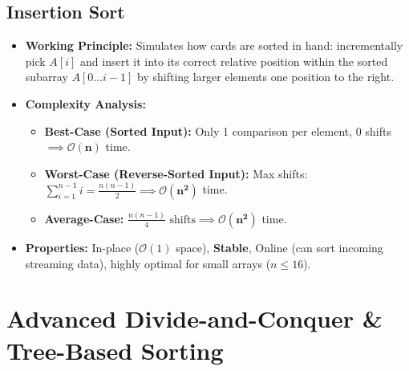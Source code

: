 \documentclass[12pt,a4paper]{article}
\begin{document}
\subsection{Insertion Sort}
\begin{itemize}[leftmargin=*, itemsep=3pt]
  \item \textbf{Working Principle:} Simulates how cards are sorted in hand: incrementally pick $A[i]$ and insert it into its correct relative position within the sorted subarray $A[0 \dots i-1]$ by shifting larger elements one position to the right.
  \item \textbf{Complexity Analysis:}
  \begin{itemize}[leftmargin=*, nosep]
    \item \textbf{Best-Case (Sorted Input):} Only 1 comparison per element, 0 shifts $\implies \mathbf{\mathcal{O}(n)}$ time.
    \item \textbf{Worst-Case (Reverse-Sorted Input):} Max shifts: $\sum_{i=1}^{n-1} i = \frac{n(n-1)}{2} \implies \mathbf{\mathcal{O}(n^2)}$ time.
    \item \textbf{Average-Case:} $\frac{n(n-1)}{4} \text{ shifts} \implies \mathbf{\mathcal{O}(n^2)}$ time.
  \end{itemize}
  \item \textbf{Properties:} In-place ($\mathcal{O}(1)$ space), \textbf{Stable}, Online (can sort incoming streaming data), highly optimal for small arrays ($n \le 16$).
\end{itemize}

\section{Advanced Divide-and-Conquer \& Tree-Based Sorting}
\end{document}
